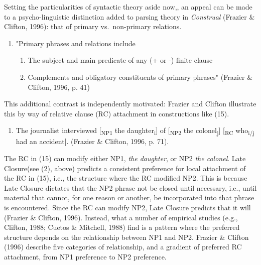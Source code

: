 \documentclass[12pt,oneside]{book}
\providecommand{\tightlist}{%
  \setlength{\itemsep}{0pt}\setlength{\parskip}{0pt}}
\begin{document}
Setting the particularities of syntactic theory aside now,, an appeal can be made to a psycho-linguistic distinction added to parsing theory in \emph{Construal} (Frazier \& Clifton, 1996): that of primary vs.~non-primary relations.

\begin{enumerate}
\def\labelenumi{(\arabic{enumi})}
\setcounter{enumi}{13}
\tightlist
\item
  "Primary phrases and relations include

  \begin{enumerate}
  \def\labelenumii{\alph{enumii})}
  \tightlist
  \item
    The subject and main predicate of any (+ or -) finite clause
  \item
    Complements and obligatory constituents of primary phrases"\linebreak\nopagebreak
    (Frazier \& Clifton, 1996, p. 41)
  \end{enumerate}
\end{enumerate}

This additional contrast is independently motivated: Frazier and Clifton illustrate this by way of relative clause (RC) attachment in constructions like (15).

\begin{enumerate}
\def\labelenumi{(\arabic{enumi})}
\setcounter{enumi}{14}
\tightlist
\item
  The journalist interviewed {[}\textsubscript{NP1} the daughter\textsubscript{i}{]} of {[}\textsubscript{NP2} the colonel\textsubscript{j}{]} {[}\textsubscript{RC} who\textsubscript{i/j} had an accident{]}. (Frazier \& Clifton, 1996, p. 71).
\end{enumerate}

The RC in (15) can modify either NP1, \emph{the daughter}, or NP2 \emph{the colonel}. Late Closure(see (2), above) predicts a consistent preference for local attachment of the RC in (15), i.e., the structure where the RC modified NP2. This is because Late Closure dictates that the NP2 phrase not be closed until necessary, i.e., until material that cannot, for one reason or another, be incorporated into that phrase is encountered. Since the RC can modify NP2, Late Closure predicts that it will (Frazier \& Clifton, 1996). Instead, what a number of empirical studies (e.g., Clifton, 1988; Cuetos \& Mitchell, 1988) find is a pattern where the preferred structure depends on the relationship between NP1 and NP2. Frazier \& Clifton (1996) describe five categories of relationship, and a gradient of preferred RC attachment, from NP1 preference to NP2 preference.
\end{document}
